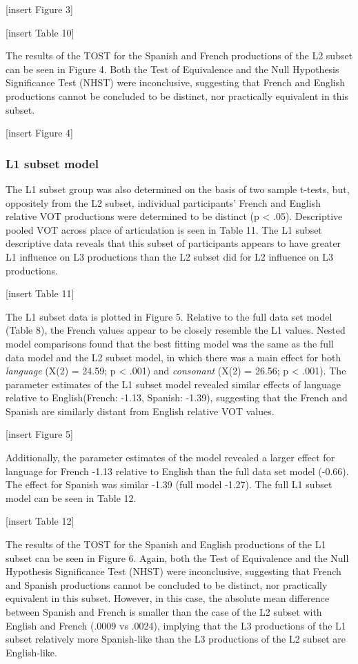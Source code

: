\documentclass[
  english,
  man]{apa6}
\begin{document}
{[}insert Figure 3{]}

{[}insert Table 10{]}

The results of the TOST for the Spanish and French productions of the L2 subset can be seen in Figure 4. Both the Test of Equivalence and the Null Hypothesis Significance Test (NHST) were inconclusive, suggesting that French and English productions cannot be concluded to be distinct, nor practically equivalent in this subset.

{[}insert Figure 4{]}

\hypertarget{l1-subset-model}{%
\subsubsection{L1 subset model}\label{l1-subset-model}}

The L1 subset group was also determined on the basis of two sample t-tests, but, oppositely from the L2 subset, individual participants' French and English relative VOT productions were determined to be distinct (p \textless{} .05).
Descriptive pooled VOT across place of articulation is seen in Table 11.
The L1 subset descriptive data reveals that this subset of participants appears to have greater L1 influence on L3 productions than the L2 subset did for L2 influence on L3 productions.

{[}insert Table 11{]}

The L1 subset data is plotted in Figure 5.
Relative to the full data set model (Table 8), the French values appear to be closely resemble the L1 values.
Nested model comparisons found that the best fitting model was the same as the full data model and the L2 subset model, in which there was a main effect for both \emph{language} (X(2) = 24.59; p \textless{} .001) and \emph{consonant} (X(2) = 26.56; p \textless{} .001).
The parameter estimates of the L1 subset model revealed similar effects of language relative to English(French: -1.13, Spanish: -1.39), suggesting that the French and Spanish are similarly distant from English relative VOT values.

{[}insert Figure 5{]}

Additionally, the parameter estimates of the model revealed a larger effect for language for French -1.13 relative to English than the full data set model (-0.66). The effect for Spanish was similar -1.39 (full model -1.27).
The full L1 subset model can be seen in Table 12.

{[}insert Table 12{]}

The results of the TOST for the Spanish and English productions of the L1 subset can be seen in Figure 6. Again, both the Test of Equivalence and the Null Hypothesis Significance Test (NHST) were inconclusive, suggesting that French and Spanish productions cannot be concluded to be distinct, nor practically equivalent in this subset. However, in this case, the absolute mean difference between Spanish and French is smaller than the case of the L2 subset with English and French (.0009 vs .0024), implying that the L3 productions of the L1 subset relatively more Spanish-like than the L3 productions of the L2 subset are English-like.
\end{document}
